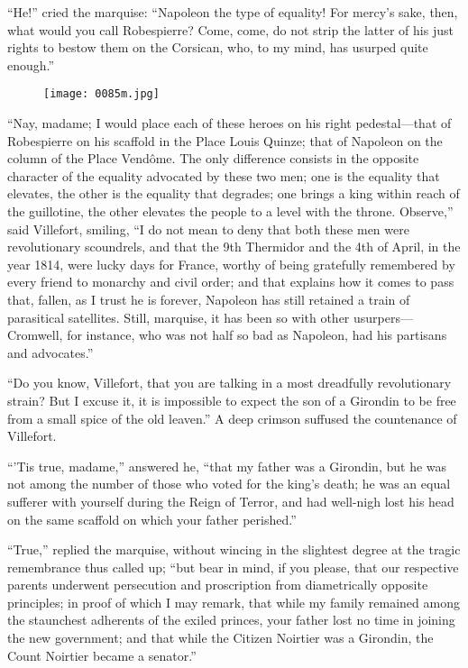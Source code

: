“He!” cried the marquise: “Napoleon the type of equality! For mercy’s
sake, then, what would you call Robespierre? Come, come, do not strip
the latter of his just rights to bestow them on the Corsican, who, to
my mind, has usurped quite enough.”

\begin{figure}[h]
\texttt{[image: 0085m.jpg]}
\end{figure}

“Nay, madame; I would place each of these heroes on his right
pedestal—that of Robespierre on his scaffold in the Place Louis Quinze;
that of Napoleon on the column of the Place Vendôme. The only
difference consists in the opposite character of the equality advocated
by these two men; one is the equality that elevates, the other is the
equality that degrades; one brings a king within reach of the
guillotine, the other elevates the people to a level with the throne.
Observe,” said Villefort, smiling, “I do not mean to deny that both
these men were revolutionary scoundrels, and that the 9th Thermidor and
the 4th of April, in the year 1814, were lucky days for France, worthy
of being gratefully remembered by every friend to monarchy and civil
order; and that explains how it comes to pass that, fallen, as I trust
he is forever, Napoleon has still retained a train of parasitical
satellites. Still, marquise, it has been so with other
usurpers—Cromwell, for instance, who was not half so bad as Napoleon,
had his partisans and advocates.”

“Do you know, Villefort, that you are talking in a most dreadfully
revolutionary strain? But I excuse it, it is impossible to expect the
son of a Girondin to be free from a small spice of the old leaven.” A
deep crimson suffused the countenance of Villefort.

“’Tis true, madame,” answered he, “that my father was a Girondin, but
he was not among the number of those who voted for the king’s death; he
was an equal sufferer with yourself during the Reign of Terror, and had
well-nigh lost his head on the same scaffold on which your father
perished.”

“True,” replied the marquise, without wincing in the slightest degree
at the tragic remembrance thus called up; “but bear in mind, if you
please, that our respective parents underwent persecution and
proscription from diametrically opposite principles; in proof of which
I may remark, that while my family remained among the staunchest
adherents of the exiled princes, your father lost no time in joining
the new government; and that while the Citizen Noirtier was a Girondin,
the Count Noirtier became a senator.”

